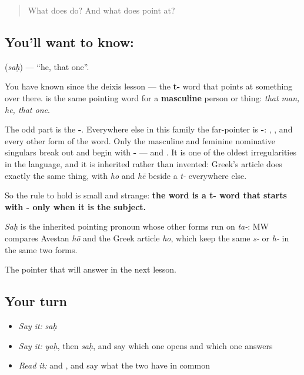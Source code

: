 \label{lesson:SA-C53-sah}



\begin{quote}
What does \textbf{} do? And what does \textbf{} point at?
\end{quote}

\subsection*{You'll want to know: }
\textbf{} (\emph{saḥ}) — \textquotedblleft{}he, that one\textquotedblright{}.

You have known \textbf{} since the deixis lesson — the \textbf{t-} word that points at something over there. \textbf{} is the same pointing word for a \textbf{masculine} person or thing: \emph{that man, he, that one}.

The odd part is the \textbf{-}. Everywhere else in this family the far-pointer is \textbf{-}: \textbf{}, \textbf{}, and every other form of the word. Only the masculine and feminine nominative singulars break out and begin with \textbf{-} — \textbf{} and \textbf{}. It is one of the oldest irregularities in the language, and it is inherited rather than invented: Greek's article does exactly the same thing, with \emph{ho} and \emph{hē} beside a \emph{t-} everywhere else.

So the rule to hold is small and strange: \textbf{the word is a t- word that starts with - only when it is the subject.}

\begin{cousinweb}
\emph{Saḥ} is the inherited pointing pronoun whose other forms run on \emph{ta-}: MW compares Avestan \emph{hō} and the Greek article \emph{ho}, which keep the same \emph{s-} or \emph{h-} in the same two forms.
\end{cousinweb}

\begin{grammarlens}[title={What you've built}]
The pointer that will answer \textbf{} in the next lesson.
\end{grammarlens}

\subsection*{Your turn}
\begin{itemize}
\raggedright
  \item \emph{Say it:} \emph{saḥ}
  \item \emph{Say it:} \emph{yaḥ}, then \emph{saḥ}, and say which one opens and which one answers
  \item \emph{Read it:} \textbf{} and \textbf{}, and say what the two have in common
\end{itemize}

